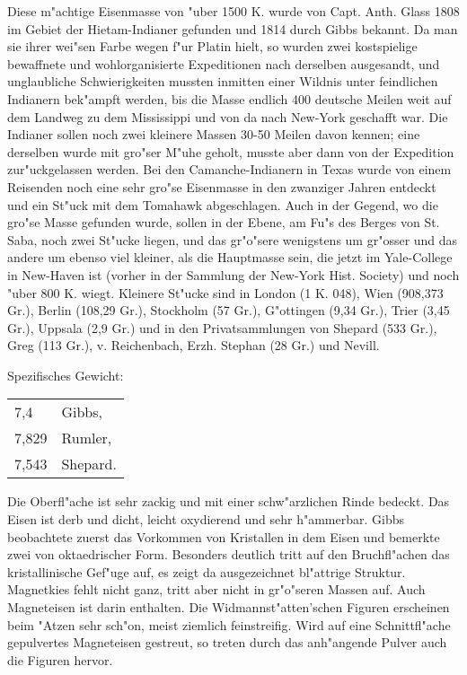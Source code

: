 \documentclass[a4paper, 11pt, oneside]{article}
\begin{document}
Diese m"achtige Eisenmasse von "uber 1500 K. wurde von Capt. Anth. Glass 1808 im Gebiet der Hietam-Indianer gefunden und 1814 durch Gibbs bekannt. Da man sie ihrer wei"sen Farbe wegen f"ur Platin hielt, so wurden zwei kostspielige bewaffnete und wohlorganisierte Expeditionen nach derselben ausgesandt, und unglaubliche Schwierigkeiten mussten inmitten einer Wildnis unter feindlichen Indianern bek"ampft werden, bis die Masse endlich 400 deutsche Meilen weit auf dem Landweg zu dem Mississippi und von da nach New-York geschafft war. Die Indianer sollen noch zwei kleinere Massen 30-50 Meilen davon kennen; eine derselben wurde mit gro"ser M"uhe geholt, musste aber dann von der Expedition zur"uckgelassen werden. Bei den Camanche-Indianern in Texas wurde von einem Reisenden noch eine sehr gro"se Eisenmasse in den zwanziger Jahren entdeckt und ein St"uck mit dem Tomahawk abgeschlagen. Auch in der Gegend, wo die gro"se Masse gefunden wurde, sollen in der Ebene, am Fu"s des Berges von St. Saba, noch zwei St"ucke liegen, und das gr"o"sere wenigstens um gr"osser und das andere um ebenso viel kleiner, als die Hauptmasse sein, die jetzt im Yale-College in New-Haven ist (vorher in der Sammlung der New-York Hist. Society) und noch "uber 800 K. wiegt. Kleinere St"ucke sind in London (1 K. 048), Wien (908,373 Gr.), Berlin (108,29 Gr.), Stockholm (57 Gr.), G"ottingen (9,34 Gr.), Trier (3,45 Gr.), Uppsala (2,9 Gr.) und in den Privatsammlungen von Shepard (533 Gr.), Greg (113 Gr.), v. Reichenbach, Erzh. Stephan (28 Gr.) und Nevill.

Spezifisches Gewicht:  
\begin{table}[!ht]
    \centering\swabfamily\Large
    \begin{tabular}{l l}
        7,4 & Gibbs,\\
        7,829 & Rumler,\\
        7,543 & Shepard.
    \end{tabular}
\end{table}

Die Oberfl"ache ist sehr zackig und mit einer schw"arzlichen Rinde bedeckt. Das Eisen ist derb und dicht, leicht oxydierend und sehr h"ammerbar. Gibbs beobachtete zuerst das Vorkommen von Kristallen in dem Eisen und bemerkte zwei von oktaedrischer Form. Besonders deutlich tritt auf den Bruchfl"achen das kristallinische Gef"uge auf, es zeigt da ausgezeichnet bl"attrige Struktur. Magnetkies fehlt nicht ganz, tritt aber nicht in gr"o"seren Massen auf. Auch Magneteisen ist darin enthalten. Die Widmannst"atten'schen Figuren erscheinen beim "Atzen sehr sch"on, meist ziemlich feinstreifig. Wird auf eine Schnittfl"ache gepulvertes Magneteisen gestreut, so treten durch das anh"angende Pulver auch die Figuren hervor.
\end{document}
